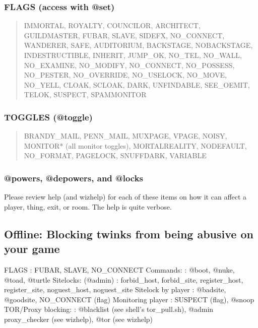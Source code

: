 \documentclass[letterpaper,10pt,english]{sphinxmanual}
\begin{document}
\subsubsection{FLAGS (access with @set)}
\label{\detokenize{security:flags-access-with-set}}\begin{quote}

\sphinxAtStartPar
IMMORTAL, ROYALTY, COUNCILOR, ARCHITECT, GUILDMASTER,
FUBAR, SLAVE, SIDEFX, NO\_CONNECT, WANDERER, SAFE,
AUDITORIUM, BACKSTAGE, NOBACKSTAGE, INDESTRUCTIBLE,
INHERIT, JUMP\_OK, NO\_TEL, NO\_WALL, NO\_EXAMINE,
NO\_MODIFY, NO\_CONNECT, NO\_POSSESS, NO\_PESTER,
NO\_OVERRIDE, NO\_USELOCK, NO\_MOVE, NO\_YELL, CLOAK,
SCLOAK, DARK, UNFINDABLE, SEE\_OEMIT, TELOK, SUSPECT,
SPAMMONITOR
\end{quote}


\subsubsection{TOGGLES (@toggle)}
\label{\detokenize{security:toggles-toggle}}\begin{quote}

\sphinxAtStartPar
BRANDY\_MAIL, PENN\_MAIL, MUXPAGE, VPAGE, NOISY,
MONITOR* (all monitor toggles), MORTALREALITY,
NODEFAULT, NO\_FORMAT, PAGELOCK, SNUFFDARK, VARIABLE
\end{quote}


\subsubsection{@powers, @depowers, and @locks}
\label{\detokenize{security:powers-depowers-and-locks}}
\sphinxAtStartPar
Please review help (and wizhelp) for each of these items on how it can affect
a player, thing, exit, or room.  The help is quite verbose.


\subsection{Offline: Blocking twinks from being abusive on your game}
\label{\detokenize{security:offline-blocking-twinks-from-being-abusive-on-your-game}}
\sphinxAtStartPar
FLAGS                   : FUBAR, SLAVE, NO\_CONNECT
Commands:               : @boot, @nuke, @toad, @turtle
Sitelocks: (@admin)     : forbid\_host, forbid\_site, register\_host, register\_site, noguest\_host, noguest\_site
Sitelock by player      : @badsite, @goodsite, NO\_CONNECT (flag)
Monitoring player       : SUSPECT (flag), @snoop
TOR/Proxy blocking:     : @blacklist (see shell’s tor\_pull.sh), @admin proxy\_checker (see wizhelp), @tor (see wizhelp)
\end{document}
